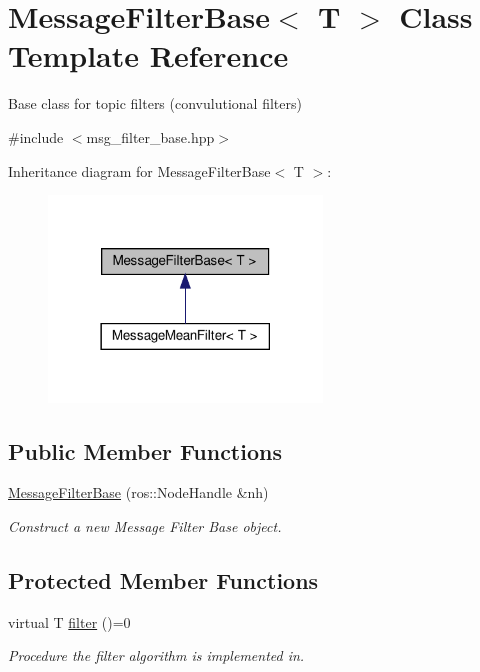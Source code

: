 \hypertarget{classMessageFilterBase}{}\section{Message\+Filter\+Base$<$ T $>$ Class Template Reference}
\label{classMessageFilterBase}


Base class for topic filters (convulutional filters)  




{\ttfamily \#include $<$msg\+\_\+filter\+\_\+base.\+hpp$>$}



Inheritance diagram for Message\+Filter\+Base$<$ T $>$\+:\nopagebreak
\begin{figure}[H]
\begin{center}
\leavevmode
\includegraphics[width=206pt]{d3/d58/classMessageFilterBase__inherit__graph}
\end{center}
\end{figure}
\subsection*{Public Member Functions}
\begin{DoxyCompactItemize}
\item 
\hyperlink{classMessageFilterBase_aeb8e41a157fef0bcf63bd8061eea4b4a}{Message\+Filter\+Base} (ros\+::\+Node\+Handle \&nh)
\begin{DoxyCompactList}\small\item\em Construct a new Message Filter Base object. \end{DoxyCompactList}\end{DoxyCompactItemize}
\subsection*{Protected Member Functions}
\begin{DoxyCompactItemize}
\item 
virtual T \hyperlink{classMessageFilterBase_a9ddc835d7366cacf63ba4a4e42839f6b}{filter} ()=0
\begin{DoxyCompactList}\small\item\em Procedure the filter algorithm is implemented in. \end{DoxyCompactList}\end{DoxyCompactItemize}
